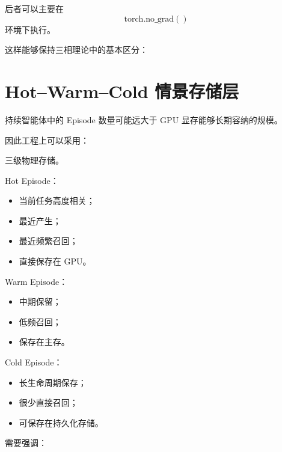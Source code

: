 后者可以主要在
\[
\mathrm{torch.no\_grad()}
\]
环境下执行。

这样能够保持三相理论中的基本区分：
\begin{statementbox}
\centering
{}
\end{statementbox}

\section{Hot--Warm--Cold 情景存储层}

持续智能体中的 Episode 数量可能远大于 GPU 显存能够长期容纳的规模。

因此工程上可以采用：

\begin{statementbox}
\centering
{}
\end{statementbox}
三级物理存储。

Hot Episode：

\begin{itemize}
    \item 当前任务高度相关；
    \item 最近产生；
    \item 最近频繁召回；
    \item 直接保存在 GPU。
\end{itemize}

Warm Episode：

\begin{itemize}
    \item 中期保留；
    \item 低频召回；
    \item 保存在主存。
\end{itemize}

Cold Episode：

\begin{itemize}
    \item 长生命周期保存；
    \item 很少直接召回；
    \item 可保存在持久化存储。
\end{itemize}

需要强调：
\begin{statementbox}
\centering
{}
\end{statementbox}

